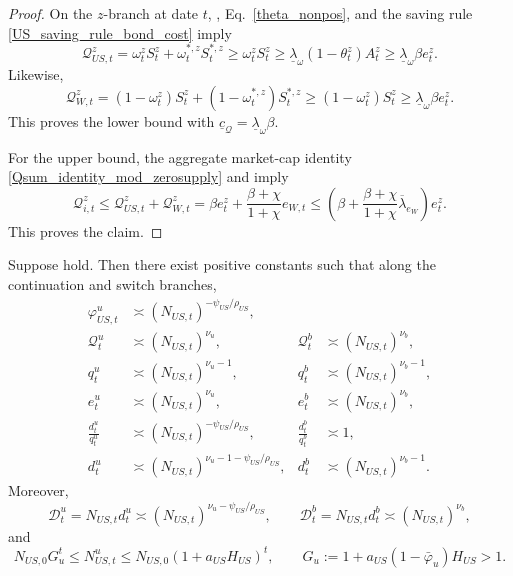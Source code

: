 \documentclass{article}
\begin{document}
\begin{proof}
On the $z$-branch at date $t$, , Eq.~\eqref{theta_nonpos}, and the saving rule \eqref{US_saving_rule_bond_cost} imply
\[
\mathcal Q_{US,t}^z
=
\omega_t^z S_t^z+\omega_t^{*,z}S_t^{*,z}
\ge
\omega_t^z S_t^z
\ge
\underline\lambda_\omega(1-\theta_t^z)A_t^z
\ge
\underline\lambda_\omega\beta e_t^z.
\]
Likewise,
\[
\mathcal Q_{W,t}^z
=
(1-\omega_t^z)S_t^z+(1-\omega_t^{*,z})S_t^{*,z}
\ge
(1-\omega_t^z)S_t^z
\ge
\underline\lambda_\omega\beta e_t^z.
\]
This proves the lower bound with $\underline c_{\mathcal Q}=\underline\lambda_\omega\beta$.

For the upper bound, the aggregate market-cap identity \eqref{Qsum_identity_mod_zerosupply} and  imply
\[
\mathcal Q_{i,t}^z
\le
\mathcal Q_{US,t}^z+\mathcal Q_{W,t}^z
=
\beta e_t^z+\frac{\beta+\chi}{1+\chi}e_{W,t}
\le
\left(\beta+\frac{\beta+\chi}{1+\chi}\overline\lambda_{e_W}\right)e_t^z.
\]
This proves the claim.
\end{proof}

\begin{lem}\label{lem_prod_orders}
Suppose  hold. Then there exist positive constants such that along the continuation and switch branches,
\begin{align}
\varphi_{US,t}^u &\asymp (N_{US,t})^{-\psi_{US}/\rho_{US}},
\label{phi_u_order}\\
\mathcal Q_t^u &\asymp (N_{US,t})^{\nu_u},
&
\mathcal Q_t^b &\asymp (N_{US,t})^{\nu_b},
\label{Q_orders_prod}\\
q_t^u &\asymp (N_{US,t})^{\nu_u-1},
&
q_t^b &\asymp (N_{US,t})^{\nu_b-1},
\label{q_orders_prod}\\
e_t^u &\asymp (N_{US,t})^{\nu_u},
&
e_t^b &\asymp (N_{US,t})^{\nu_b},
\label{e_orders_prod}\\
\frac{d_t^u}{q_t^u} &\asymp (N_{US,t})^{-\psi_{US}/\rho_{US}},
&
\frac{d_t^b}{q_t^b} &\asymp 1,
\label{dq_orders_prod}\\
d_t^u &\asymp (N_{US,t})^{\nu_u-1-\psi_{US}/\rho_{US}},
&
d_t^b &\asymp (N_{US,t})^{\nu_b-1}.
\label{d_orders_prod}
\end{align}
Moreover,
\[
\mathcal D_t^u=N_{US,t}d_t^u\asymp (N_{US,t})^{\nu_u-\psi_{US}/\rho_{US}},
\qquad
\mathcal D_t^b=N_{US,t}d_t^b\asymp (N_{US,t})^{\nu_b},
\]
and
\begin{equation}\label{Nu_geometric_growth}
N_{US,0}G_u^t
\le
N_{US,t}^u
\le
N_{US,0}(1+a_{US}H_{US})^t,
\qquad
G_u:=1+a_{US}(1-\bar\varphi_u)H_{US}>1.
\end{equation}
\end{lem}
\end{document}
